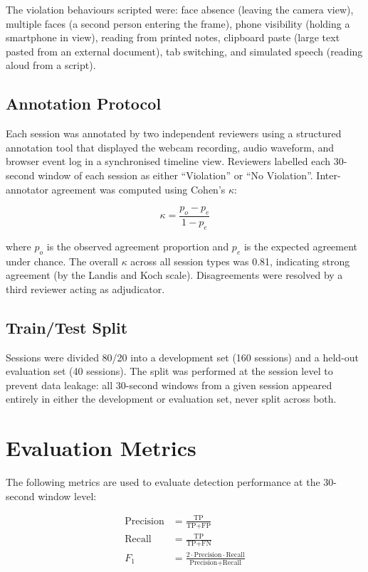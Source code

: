 The violation behaviours scripted were: face absence (leaving the camera view), multiple faces (a second person entering the frame), phone visibility (holding a smartphone in view), reading from printed notes, clipboard paste (large text pasted from an external document), tab switching, and simulated speech (reading aloud from a script).

\subsection{Annotation Protocol}

Each session was annotated by two independent reviewers using a structured annotation tool that displayed the webcam recording, audio waveform, and browser event log in a synchronised timeline view. Reviewers labelled each 30-second window of each session as either ``Violation'' or ``No Violation''. Inter-annotator agreement was computed using Cohen's $\kappa$:

\begin{equation}
    \kappa = \frac{p_o - p_e}{1 - p_e}
    \label{eq:kappa}
\end{equation}

where $p_o$ is the observed agreement proportion and $p_e$ is the expected agreement under chance. The overall $\kappa$ across all session types was 0.81, indicating strong agreement (by the Landis and Koch \cite{landiskoch1977} scale). Disagreements were resolved by a third reviewer acting as adjudicator.

\subsection{Train/Test Split}

Sessions were divided 80/20 into a development set (160 sessions) and a held-out evaluation set (40 sessions). The split was performed at the session level to prevent data leakage: all 30-second windows from a given session appeared entirely in either the development or evaluation set, never split across both.

\section{Evaluation Metrics}

The following metrics are used to evaluate detection performance at the 30-second window level:

\begin{align}
    \text{Precision} &= \frac{\text{TP}}{\text{TP} + \text{FP}} \label{eq:precision} \\
    \text{Recall} &= \frac{\text{TP}}{\text{TP} + \text{FN}} \label{eq:recall} \\
    F_1 &= \frac{2 \cdot \text{Precision} \cdot \text{Recall}}{\text{Precision} + \text{Recall}} \label{eq:f1}
\end{align}

